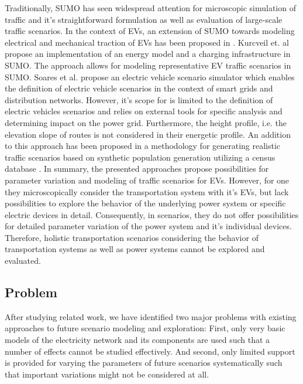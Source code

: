 Traditionally, SUMO \cite{behrisch2011sumo} has seen widespread attention for microscopic simulation of traffic and it's straightforward formulation as well as evaluation of large-scale traffic scenarios. In the context of EVs, an extension of SUMO towards modeling electrical and mechanical traction of EVs has been proposed in \cite{maia2011electric}. Kurcveil et. al \cite{kurczveil2014implementation} propose an implementation of an energy model and a charging infrastructure in SUMO. The approach allows for modeling representative EV traffic scenarios in SUMO. Soares et al. \cite{soares2012electric} propose an electric vehicle scenario simulator which enables the definition of electric vehicle scenarios in the context of smart grids and distribution networks. However, it's scope for is limited to the definition of electric vehicles scenarios and relies on external tools for specific analysis and determining impact on the power grid. Furthermore, the height profile, i.e. the elevation slope of routes is not considered in their energetic profile. An addition to this approach has been proposed in a methodology for generating realistic traffic scenarios based on synthetic population generation utilizing a census database \cite{soares2014realistic}.
In summary, the presented approaches propose possibilities for parameter variation and modeling of traffic scenarios for EVs. However, for one they microscopically consider the transportation system with it's EVs, but lack possibilities to explore the behavior of the underlying power system or specific electric devices in detail. Consequently, in scenarios, they do not offer possibilities for detailed parameter variation of the power system and it's individual devices. Therefore, holistic transportation scenarios considering the behavior of transportation systems as well as power systems cannot be explored and evaluated.

\subsection{Problem}

After studying related work, we have identified two major problems with existing approaches to future scenario modeling and exploration: First, only very basic models of the electricity network and its components are used such that a number of effects cannot be studied effectively. And second, only limited support is provided for varying the parameters of future scenarios systematically such that important variations might not be considered at all.

